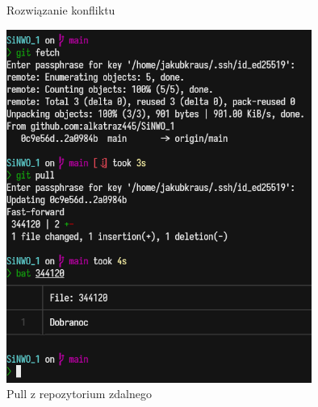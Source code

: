 \documentclass[a4paper,12pt]{article}
\begin{document}
\begin{figure}[ht]
    \centering
    \hfill
    \caption{Rozwiązanie konfliktu}
\end{figure}

\begin{figure}[hb]
    \centering
    \includegraphics[width=10cm]{images/git-9.png}
    \caption{Pull z repozytorium zdalnego}
\end{figure}
\end{document}
